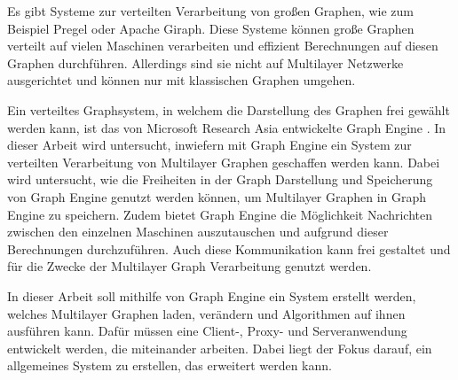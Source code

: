 Es gibt Systeme zur verteilten Verarbeitung von großen Graphen, wie zum Beispiel Pregel \cite{pregel} oder Apache Giraph. Diese Systeme können große Graphen verteilt auf vielen Maschinen verarbeiten und effizient Berechnungen auf diesen Graphen durchführen. Allerdings sind sie nicht auf Multilayer Netzwerke ausgerichtet und können nur mit klassischen Graphen umgehen.


Ein verteiltes Graphsystem, in welchem die Darstellung des Graphen frei gewählt werden kann, ist das von Microsoft Research Asia entwickelte Graph Engine \cite{graphEngine} \cite{TrinityAndApps}.
In dieser Arbeit wird untersucht, inwiefern mit Graph Engine ein System zur verteilten Verarbeitung von Multilayer Graphen geschaffen werden kann. Dabei wird untersucht, wie die Freiheiten in der Graph Darstellung und Speicherung von Graph Engine genutzt werden können,
um Multilayer Graphen in Graph Engine zu speichern. Zudem bietet Graph Engine die Möglichkeit Nachrichten zwischen den einzelnen Maschinen auszutauschen und aufgrund dieser Berechnungen durchzuführen. Auch diese Kommunikation kann frei gestaltet und für die Zwecke der Multilayer Graph Verarbeitung genutzt werden.


In dieser Arbeit soll mithilfe von Graph Engine ein System erstellt werden, welches Multilayer Graphen laden, verändern und Algorithmen auf ihnen ausführen kann. Dafür müssen eine Client-, Proxy- und Serveranwendung entwickelt werden, die miteinander arbeiten.
Dabei liegt der Fokus darauf, ein allgemeines System zu erstellen, das erweitert werden kann. 
